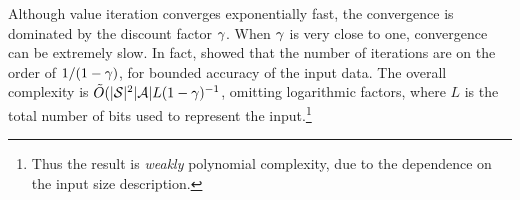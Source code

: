Although value iteration converges exponentially fast, the convergence
is dominated by the discount factor $\gamma$. When $\gamma$ is very
close to one, convergence can be extremely slow.  In fact,
\citet{tseng1990solving} showed that the number of iterations are on
the order of $1 / (1 - \gamma)$, for bounded accuracy of the input
data. The overall complexity is
$\tilde{O}(|{\mathcal{S}}|^2 |{\mathcal{A}}| L (1 - \gamma)^{-1}$, omitting logarithmic
factors, where $L$ is the total number of bits used to represent the
input.\footnote{Thus the result is \emph{weakly} polynomial complexity, due to the dependence on the input size description.}
